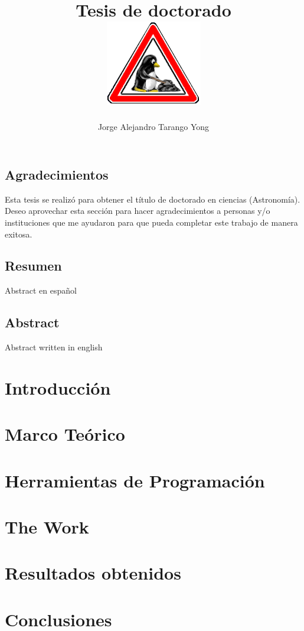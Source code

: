 \documentclass[10pt]{report}
\title{Tesis de doctorado\\
\includegraphics[width=0.7\linewidth]{./Figures/tux-development}
}
\author{Jorge Alejandro Tarango Yong}
\begin{document}
\maketitle


\tableofcontents
\newpage
\section*{Agradecimientos}

Esta tesis se realiz\'o para obtener el t\'itulo de doctorado en 
ciencias (Astronom\'ia). Deseo aprovechar esta secci\'on para hacer
agradecimientos a personas y/o instituciones que me ayudaron para que 
pueda completar este trabajo de manera exitosa.
\newpage
\section*{Resumen}
  Abstract en espa\~nol

\newpage
\section*{Abstract}
  Abstract written in english

\newpage
\chapter{Introducci\'on}

\chapter{Marco Te\'orico}

\chapter{Herramientas de Programaci\'on}

\chapter{The Work}

\chapter{Resultados obtenidos}

\chapter{Conclusiones}




\end{document}
